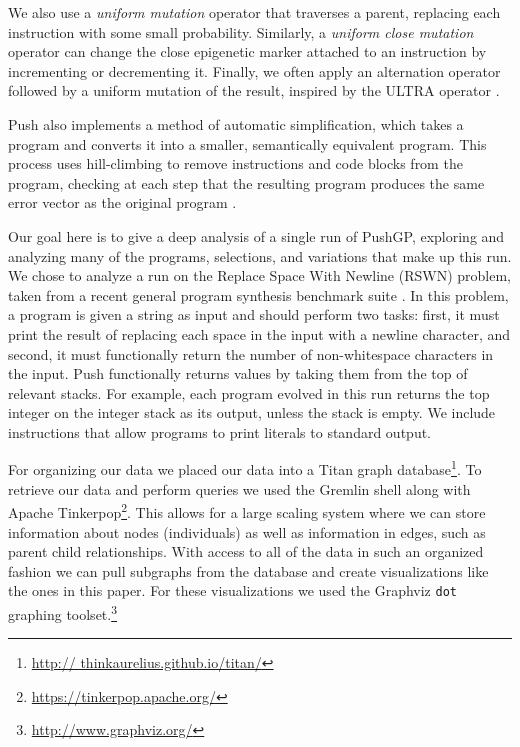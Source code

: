 
We also use a \textit{uniform mutation} operator that traverses a parent, 
replacing each instruction with some small probability. Similarly, a 
\textit{uniform close mutation} operator can change the close epigenetic marker 
attached to an instruction by incrementing or decrementing it. Finally, we 
often apply an alternation operator followed by a uniform mutation of the 
result, inspired by the ULTRA operator \citep{Spector:2013:GPTP}.

Push also implements a method of automatic simplification, which takes a program and 
converts it into a smaller, semantically equivalent program. This process uses 
hill-climbing to remove instructions and code blocks from the program, checking 
at each step that the resulting program produces the same error vector as the 
original program \citep{Spector:2014:GECCOcomp}.

Our goal here is to give a deep analysis of a single run of PushGP, exploring and analyzing many of the programs, selections, and variations that make up this run. We chose to analyze a run on the Replace Space With Newline (RSWN) problem, taken from a recent general program synthesis benchmark suite \citep{Helmuth:2015:GECCO}. In this problem, a program is given a string as input and should perform two tasks: first, it must print the result of replacing each space in the input with a newline character, and second, it must functionally return the number of non-whitespace characters in the input. Push functionally returns values by taking them from the top of relevant stacks. For example, each program evolved in this run returns the top integer on the integer stack as its output, unless the stack is empty. We include instructions that allow programs to print literals to standard output.

For organizing our data we placed our data into a Titan graph database\footnote{\url{http://
		thinkaurelius.github.io/titan/}}. To retrieve our data and perform
queries we used the Gremlin shell along with Apache Tinkerpop\footnote{\url{https://tinkerpop.apache.org/}}. This allows for a large scaling system where
we can store information about nodes (individuals) as well as information in edges, such as parent child relationships. With access to all of the data in such an organized fashion we can pull subgraphs from the
database and create visualizations like the ones in this paper. For these visualizations we used the
Graphviz \texttt{dot} graphing toolset.\footnote{\url{http://www.graphviz.org/}}

